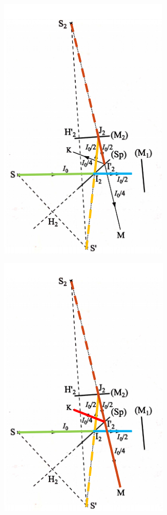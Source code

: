 \documentclass[10pt]{beamer}
\begin{document}
\begin{frame}{\insertsubsection}
    \begin{figure}
        \centering
        \includegraphics[width=.4\textwidth]{M7.png}
    \end{figure}
\end{frame}
\begin{frame}{\insertsubsection}
    \begin{figure}
        \centering
        \includegraphics[width=.4\textwidth]{M8.png}
    \end{figure}
\end{frame}
\end{document}
